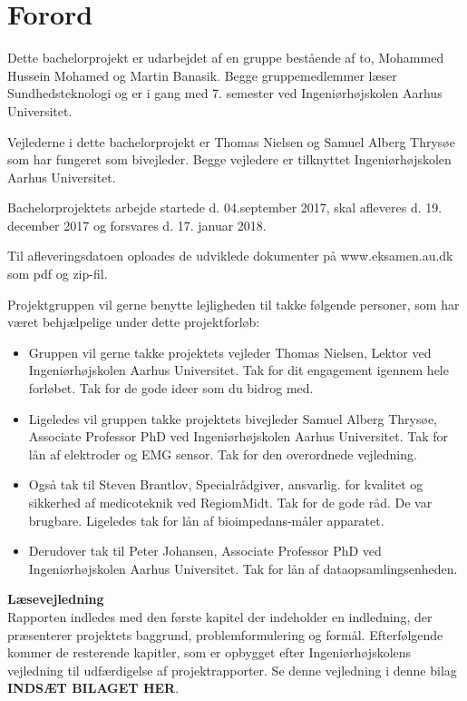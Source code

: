 \chapter{Forord}

Dette bachelorprojekt er udarbejdet af en gruppe bestående af to, Mohammed Hussein Mohamed og Martin Banasik. Begge gruppemedlemmer læser Sundhedsteknologi og er i gang med 7. semester ved Ingeniørhøjskolen Aarhus Universitet.

Vejlederne i dette bachelorprojekt er Thomas Nielsen og Samuel Alberg Thrysøe som har fungeret som bivejleder. Begge vejledere er tilknyttet Ingeniørhøjskolen Aarhus Universitet.

Bachelorprojektets arbejde startede d. 04.september 2017,  skal afleveres d. 19. december 2017 og forsvares d. 17. januar 2018.

Til afleveringsdatoen oploades de udviklede dokumenter på www.eksamen.au.dk som pdf og zip-fil. 

Projektgruppen vil gerne benytte lejligheden til takke følgende personer, som har været behjælpelige under dette projektforløb:

\begin{itemize}
\item	Gruppen vil gerne takke projektets vejleder Thomas Nielsen, Lektor  ved Ingeniørhøjskolen Aarhus Universitet. Tak for dit engagement igennem  hele forløbet. Tak for de gode ideer som du bidrog med.  

\item Ligeledes vil gruppen takke projektets bivejleder Samuel Alberg Thrysøe, Associate Professor PhD ved Ingeniørhøjskolen Aarhus Universitet. Tak for lån af elektroder og EMG sensor. Tak for den overordnede vejledning.   

\item Også tak til Steven Brantlov, Specialrådgiver, ansvarlig. for kvalitet og sikkerhed af medicoteknik ved RegiomMidt. Tak for de gode råd. De var brugbare. Ligeledes tak for lån af bioimpedans-måler apparatet.  

\item Derudover tak til Peter Johansen, Associate Professor PhD ved Ingeniørhøjskolen Aarhus Universitet. Tak for lån af dataopsamlingsenheden. 
  
\end{itemize}

\pagebreak

\textbf{Læsevejledning}\\
Rapporten indledes med den første kapitel der indeholder en indledning, der præsenterer projektets baggrund, problemformulering og formål. Efterfølgende kommer de resterende kapitler, som er opbygget efter Ingeniørhøjskolens vejledning til udfærdigelse af projektrapporter. Se denne vejledning i denne bilag \textbf{INDSÆT BILAGET HER}. 

